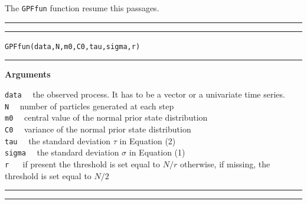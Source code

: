\documentclass[
]{book}
\theoremstyle{break}
\theoremstyle{nonumberplain}
\begin{document}
The \texttt{GPFfun} function resume this passages.\\

\hrule
\hrule

\hfill\break
\texttt{GPFfun(data,N,m0,C0,tau,sigma,r)}\\

\hrule

\textbf{Arguments}

\texttt{data} ~~the observed process. It has to be a vector or a
univariate time series.\\
\texttt{N} ~~number of particles generated at each step\\
\texttt{m0} ~~central value of the normal prior state distribution\\
\texttt{C0} ~~variance of the normal prior state distribution\\
\texttt{tau} ~~the standard deviation \(\tau\) in Equation (2)\\
\texttt{sigma} ~~the standard deviation \(\sigma\) in Equation (1)\\
\texttt{r} ~~ if present the threshold is set equal to \(N/r\)
otherwise, if missing, the threshold is set equal to \(N/2\)

\hrule
\hrule
\end{document}
